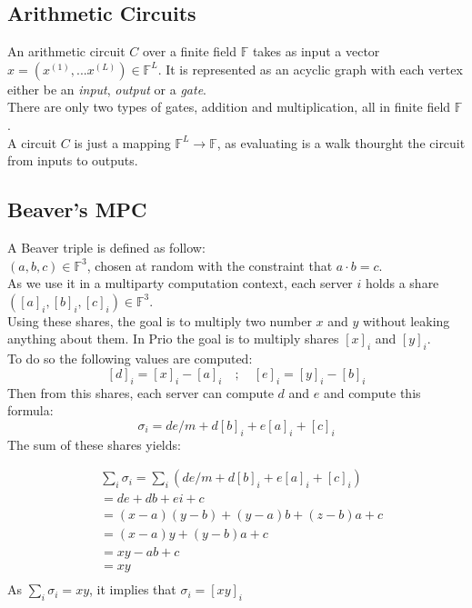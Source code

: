 \documentclass{article}
\begin{document}
\subsection*{Arithmetic Circuits}
An arithmetic circuit $C$ over a finite field $\mathbb{F}$ takes as input a vector $x = (x^{(1)},...x^{(L)}) \in \mathbb{F}^L $. It is represented as an acyclic graph with each vertex either be an \textit{input}, \textit{output} or a \textit{gate}.\\
There are only two types of gates, addition and multiplication, all in finite field $\mathbb{F}$.\\
A circuit $C$ is just a mapping $\mathbb{F}^L \rightarrow \mathbb{F}$, as evaluating is a walk thourght the circuit from inputs to outputs.

\subsection*{Beaver's MPC}
A Beaver triple is defined as follow:\\
$(a,b,c) \in \mathbb{F}^3$, chosen at random with the constraint that $a \cdot b = c$.\\
As we use it in a multiparty computation context, each server $i$ holds a share $([a]_i , [b]_i , [c]_i) \in \mathbb{F}^3$.\\
Using these shares, the goal is to multiply two number $x$ and $y$ without leaking anything about them. In Prio the goal is to multiply shares $[x]_i$ and $[y]_i$.\\
To do so the following values are computed:
$$[d]_i = [x]_i -[a]_i  \quad  ;  \quad  [e]_i = [y]_i - [b]_i$$ 
Then from this shares, each server can compute $d$ and $e$ and compute this formula:\\
$$\sigma_i = de/m + d[b]_i +e[a]_i + [c]_i$$
The sum of these shares yields:

\begin{equation}
\begin{split}
& \sum_{i} \sigma_i = \sum_{i}{(de/m +d[b]_i + e[a]_i + [c]_i)}\\
 & = de +db +ei + c\\
 & = (x-a)(y-b)+ (y-a)b + (z-b)a + c\\
 & = (x-a)y + (y-b)a + c\\
 & = xy -ab + c\\
 & = xy\\
\end{split}
\end{equation}
As $\sum_{i} \sigma_i = xy$, it implies that $\sigma_i = [xy]_i$ 
\end{document}

